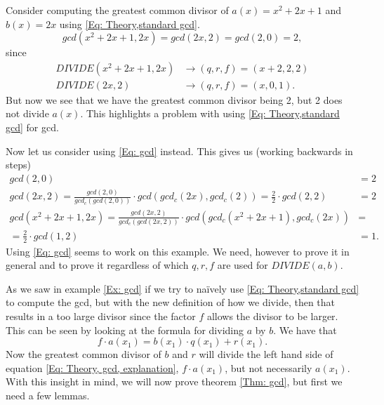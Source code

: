 \begin{example}\label{Ex: gcd}
  Consider computing the greatest common divisor of $a(x)=x^2+2x+1$ and $b(x)=2x$ using \eqref{Eq: Theory,standard gcd}.
  \begin{equation}
    gcd(x^2+2x+1,2x)=gcd(2x,2)=gcd(2,0)=2,
  \end{equation}
  since
  \begin{equation}
    \begin{split}
      DIVIDE(x^2+2x+1,2x) & \rightarrow (q,r,f)=(x+2,2,2) \\
      DIVIDE(2x,2) & \rightarrow (q,r,f)=(x,0,1).
    \end{split}
  \end{equation}
  But now we see that we have the greatest common divisor being 2, but 2 does not divide $a(x)$. This highlights a problem with using \eqref{Eq: Theory,standard gcd} for gcd.

  Now let us consider using \eqref{Eq: gcd} instead. This gives us (working backwards in steps)
  \begin{equation}
    \begin{split}
      gcd(2,0) &= 2 \\
      gcd(2x,2) = \frac{gcd(2,0)}{gcd_c(gcd(2,0))}\cdot gcd(gcd_c(2x),gcd_c(2))= \frac{2}{2}\cdot gcd(2,2) &= 2 \\
      gcd(x^2+2x+1,2x) =\frac{gcd(2x,2)}{gcd_c(gcd(2x,2))}\cdot gcd(gcd_c(x^2+2x+1),gcd_c(2x)) & = \\ = \frac{2}{2}\cdot gcd(1,2) & = 1.
    \end{split}
  \end{equation}
  Using \eqref{Eq: gcd} seems to work on this example. We need, however to prove it in general and to prove it regardless of which $q,r,f$ are used for $DIVIDE(a,b)$.
\end{example}
As we saw in example \ref{Ex: gcd} if we try to naïvely use \eqref{Eq: Theory,standard gcd} to compute the gcd, but with the new definition of how we divide, then that results in a too large divisor since the factor $f$ allows the divisor to be larger. This can be seen by looking at the formula for dividing $a$ by $b$. We have that
\begin{equation}\label{Eq: Theory, gcd, explanation}
  f\cdot a(x_1)=b(x_1)\cdot q(x_1) + r(x_1).
\end{equation}
Now the greatest common divisor of $b$ and $r$ will divide the left hand side of equation \eqref{Eq: Theory, gcd, explanation}, $f\cdot a(x_1)$, but not necessarily $a(x_1)$. With this insight in mind, we will now prove theorem \ref{Thm: gcd}, but first we need a few lemmas.
